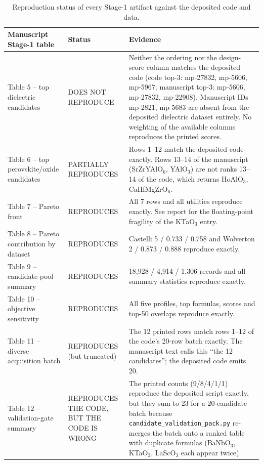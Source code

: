 \begin{table}[htbp]
\centering
\scriptsize
\setlength{\tabcolsep}{3pt}
\caption{Reproduction status of every Stage-1 artifact against the deposited code and data.}
\label{tab:a1_repro}
\begin{tabular}{p{}p{}p{}}
\toprule
Manuscript Stage-1 table & Status & Evidence \\
\midrule
Table 5 -- top dielectric candidates & DOES NOT REPRODUCE & Neither the ordering nor the design-score column matches the deposited code (code top-3: mp-27832, mp-5606, mp-5967; manuscript top-3: mp-5606, mp-27832, mp-22908). Manuscript IDs mp-2821, mp-5683 are absent from the deposited dielectric dataset entirely. No weighting of the available columns reproduces the printed scores. \\
Table 6 -- top perovskite/oxide candidates & PARTIALLY REPRODUCES & Rows 1--12 match the deposited code exactly. Rows 13--14 of the manuscript (SrZrYAlO$_6$, YAlO$_3$) are not ranks 13--14 of the code, which returns HoAlO$_{3}$, CaHfMgZrO$_{6}$. \\
Table 7 -- Pareto front & REPRODUCES & All 7 rows and all utilities reproduce exactly. See report for the floating-point fragility of the KTaO$_3$ entry. \\
Table 8 -- Pareto contribution by dataset & REPRODUCES & Castelli 5 / 0.733 / 0.758 and Wolverton 2 / 0.873 / 0.888 reproduce exactly. \\
Table 9 -- candidate-pool summary & REPRODUCES & 18{,}928 / 4{,}914 / 1{,}306 records and all summary statistics reproduce exactly. \\
Table 10 -- objective sensitivity & REPRODUCES & All five profiles, top formulas, scores and top-50 overlaps reproduce exactly. \\
Table 11 -- diverse acquisition batch & REPRODUCES (but truncated) & The 12 printed rows match rows 1--12 of the code's 20-row batch exactly. The manuscript text calls this ``the 12 candidates''; the deposited code emits 20. \\
Table 12 -- validation-gate summary & REPRODUCES THE CODE, BUT THE CODE IS WRONG & The printed counts (9/8/4/1/1) reproduce the deposited script exactly, but they sum to 23 for a 20-candidate batch because \texttt{candidate\_validation\_pack.py} re-merges the batch onto a ranked table with duplicate formulas (BaNbO$_3$, KTaO$_3$, LaScO$_3$ each appear twice). \\
\bottomrule
\end{tabular}
\end{table}
